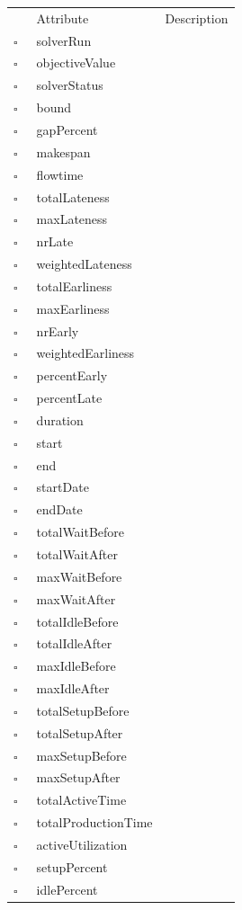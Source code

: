 \begin{table}
\caption{Solution  }

\begin{longtable}{llp{8cm}}
& Attribute & Description \\
$\square$\ & solverRun &  \\
$\square$\ & objectiveValue &  \\
$\square$\ & solverStatus &  \\
$\square$\ & bound &  \\
$\square$\ & gapPercent &  \\
$\square$\ & makespan &  \\
$\square$\ & flowtime &  \\
$\square$\ & totalLateness &  \\
$\square$\ & maxLateness &  \\
$\square$\ & nrLate &  \\
$\square$\ & weightedLateness &  \\
$\square$\ & totalEarliness &  \\
$\square$\ & maxEarliness &  \\
$\square$\ & nrEarly &  \\
$\square$\ & weightedEarliness &  \\
$\square$\ & percentEarly &  \\
$\square$\ & percentLate &  \\
$\square$\ & duration &  \\
$\square$\ & start &  \\
$\square$\ & end &  \\
$\square$\ & startDate &  \\
$\square$\ & endDate &  \\
$\square$\ & totalWaitBefore &  \\
$\square$\ & totalWaitAfter &  \\
$\square$\ & maxWaitBefore &  \\
$\square$\ & maxWaitAfter &  \\
$\square$\ & totalIdleBefore &  \\
$\square$\ & totalIdleAfter &  \\
$\square$\ & maxIdleBefore &  \\
$\square$\ & maxIdleAfter &  \\
$\square$\ & totalSetupBefore &  \\
$\square$\ & totalSetupAfter &  \\
$\square$\ & maxSetupBefore &  \\
$\square$\ & maxSetupAfter &  \\
$\square$\ & totalActiveTime &  \\
$\square$\ & totalProductionTime &  \\
$\square$\ & activeUtilization &  \\
$\square$\ & setupPercent &  \\
$\square$\ & idlePercent &  \\
\end{longtable}
\label{attr:Solution}
\end{table}

